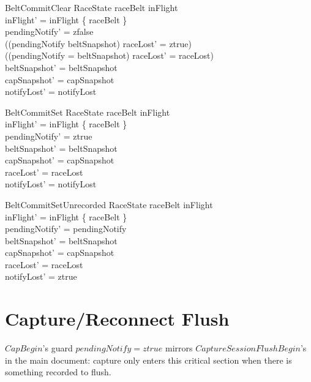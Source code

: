 \documentclass[a4paper,10pt,fleqn]{article}
\begin{document}
\begin{schema}{BeltCommitClear}
  \Delta RaceState
  \where
  raceBelt \in inFlight \\
  inFlight' = inFlight \setminus \{ raceBelt \} \\
  pendingNotify' = zfalse \\
  ((pendingNotify \neq beltSnapshot) \implies raceLost' = ztrue) \\
  ((pendingNotify = beltSnapshot) \implies raceLost' = raceLost) \\
  beltSnapshot' = beltSnapshot \\
  capSnapshot' = capSnapshot \\
  notifyLost' = notifyLost
\end{schema}

\begin{schema}{BeltCommitSet}
  \Delta RaceState
  \where
  raceBelt \in inFlight \\
  inFlight' = inFlight \setminus \{ raceBelt \} \\
  pendingNotify' = ztrue \\
  beltSnapshot' = beltSnapshot \\
  capSnapshot' = capSnapshot \\
  raceLost' = raceLost \\
  notifyLost' = notifyLost
\end{schema}

\begin{schema}{BeltCommitSetUnrecorded}
  \Delta RaceState
  \where
  raceBelt \in inFlight \\
  inFlight' = inFlight \setminus \{ raceBelt \} \\
  pendingNotify' = pendingNotify \\
  beltSnapshot' = beltSnapshot \\
  capSnapshot' = capSnapshot \\
  raceLost' = raceLost \\
  notifyLost' = ztrue
\end{schema}

\section{Capture/Reconnect Flush}

$CapBegin$'s guard $pendingNotify = ztrue$ mirrors
$CaptureSessionFlushBegin$'s in the main document: capture only enters
this critical section when there is something recorded to flush.
\end{document}
